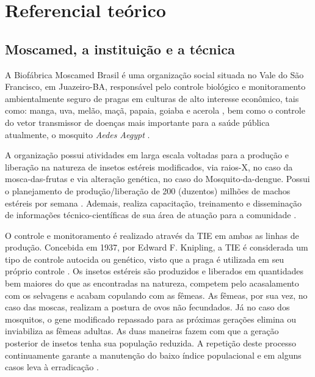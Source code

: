 \chapter{Referencial teórico}

\section{Moscamed, a instituição e a técnica}

A Biofábrica Moscamed Brasil é uma organização social situada no Vale do São Francisco, em Juazeiro-BA, responsável pelo controle biológico e monitoramento ambientalmente seguro de pragas em culturas de alto interesse econômico, tais como: manga, uva, melão, maçã, papaia, goiaba e acerola \cite{MOSCAMED2010LINHAS}, bem como o controle do vetor transmissor de doenças mais importante para a saúde pública atualmente, o mosquito \textit{Aedes Aegypt} \cite{MOSCAMEDINST2003, MOSCAMED2010LINHAS}.

A organização possui atividades em larga escala voltadas para a produção e liberação na natureza de insetos estéreis modificados, via raios-X, no caso da mosca-das-frutas e via alteração genética, no caso do Mosquito-da-dengue. Possui o planejamento de produção/liberação de 200 (duzentos) milhões de machos estéreis por semana \cite{MOSCAMEDINST2003, MOSCAMED2003CTI}. Ademais, realiza capacitação, treinamento e disseminação de informações técnico-científicas de sua área de atuação para a comunidade \cite{MOSCAMED2010AREAS}.

O controle e monitoramento é realizado através da TIE em ambas as linhas de produção. Concebida em 1937, por Edward F. Knipling, a TIE é considerada um tipo de controle autocida ou genético, visto que a praga é utilizada em seu próprio controle \cite{TIE2015}. Os insetos estéreis são produzidos e liberados em quantidades bem maiores do que as encontradas na natureza, competem pelo acasalamento com os selvagens e acabam copulando com as fêmeas. As fêmeas, por sua vez, no caso das moscas, realizam a postura de ovos não fecundados. Já no caso dos mosquitos, o gene modificado repassado para as próximas gerações elimina ou inviabiliza as fêmeas adultas. As duas maneiras fazem com que a geração posterior de insetos tenha sua população reduzida. A repetição deste processo continuamente garante a manutenção do baixo índice populacional e em alguns casos leva à erradicação \cite{MOSCAMEDINST2003, MOSCAMED2003CTI, MOSCAMED2010LINHAS}.

